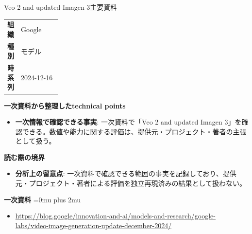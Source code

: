 \begin{technicalnote}{Veo 2 and updated Imagen 3}{主要資料}
\begingroup
\begin{tabularx}{\linewidth}{@{}>{\bfseries}p{0.22\linewidth}X@{}}
組織 & Google \\
種別 & モデル \\
時系列 & 2024-12-16 \\
\end{tabularx}
\smallskip
{\bfseries 一次資料から整理したtechnical points}
\begin{itemize}[leftmargin=1.5em,itemsep=0.35em]
\item \textbf{一次情報で確認できる事実}: 一次資料で「Veo 2 and updated Imagen 3」を確認できる。数値や能力に関する評価は、提供元・プロジェクト・著者の主張として扱う。
\end{itemize}
\begin{minipage}{\linewidth}
{\bfseries 読む際の境界}
\begin{itemize}[leftmargin=1.5em,itemsep=0.35em]
\item \textbf{分析上の留意点}: 一次資料で確認できる範囲の事実を記録しており、提供元・プロジェクト・著者による評価を独立再現済みの結果として扱わない。
\end{itemize}
\begin{samepage}
{\bfseries 一次資料}
\begingroup\sloppy
\Urlmuskip=0mu plus 2mu\relax
\begin{itemize}[leftmargin=1.5em,itemsep=0.25em]
\item {\scriptsize\url{https://blog.google/innovation-and-ai/models-and-research/google-labs/video-image-generation-update-december-2024/}}
\end{itemize}
\endgroup
\end{samepage}
\end{minipage}
\endgroup
\end{technicalnote}
\medskip

